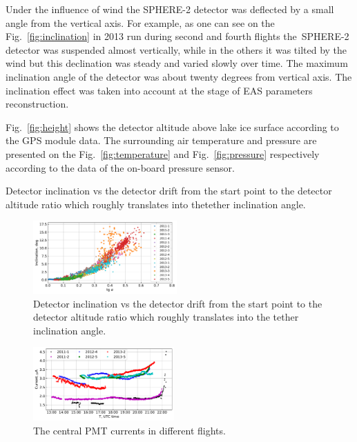 \documentclass[final,5p,times,twocolumn]{elsarticle}
\begin{document}
Under the influence of wind the SPHERE-2 detector was deflected by a small angle from the vertical axis. For example, as one can see on the Fig.~\ref{fig:inclination} in 2013 run during second and fourth flights the~\mbox{SPHERE-2} detector was suspended almost vertically, while in the others it was tilted by the wind but this declination was steady and varied slowly over time. The maximum inclination angle of the detector was about twenty degrees from vertical axis. The inclination effect was taken into account at the stage of EAS parameters reconstruction.

Fig.~\ref{fig:height} shows the detector altitude above lake ice surface according to the GPS module data. The surrounding air temperature and pressure are presented on the Fig.~\ref{fig:temperature} and Fig.~\ref{fig:pressure} respectively according to the data of the on-board pressure sensor.

 Detector inclination vs the detector drift from the start point to the detector altitude ratio which roughly translates into thetether inclination angle.

\begin{figure}[tb]
    \includegraphics[width=0.49\textwidth]{tg-inclination.pdf}
    \caption{Detector inclination vs the detector drift from the start point to the detector altitude ratio which roughly translates into the tether inclination angle.}
\label{fig:drift-inclination}
\end{figure}

\begin{figure}[tb]
    \includegraphics[width=0.48\textwidth]{hv-53.pdf}
    \caption{The central PMT currents in different flights.}
\label{fig:current}
\end{figure}
\end{document}
